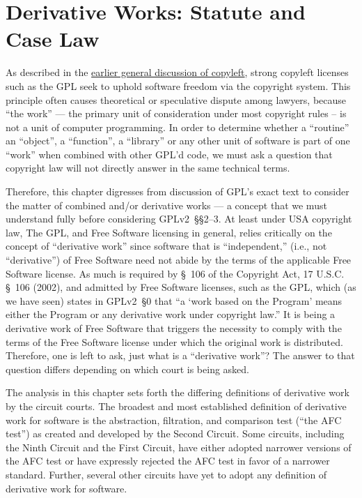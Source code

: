 
\chapter{Derivative Works: Statute and Case Law}
\label{derivative-works}

As described in the \hyperref[copyleft-definition]{earlier general discussion
  of copyleft}, strong copyleft licenses such as the GPL seek to uphold
software freedom via the copyright system.  This principle often causes
theoretical or speculative dispute among lawyers, because ``the work'' ---
the primary unit of consideration under most copyright rules -- is not a unit
of computer programming. In order to determine whether a ``routine'' an
``object'', a ``function'', a ``library'' or any other unit of software is
part of one ``work'' when combined with other GPL'd code, we must ask a
question that copyright law will not directly answer in the same technical
terms.

Therefore, this chapter digresses from  discussion of GPL's exact text to
consider the matter of combined and/or derivative works --- a concept that we must
understand fully before considering GPLv2~\S\S2--3\@.  At least under USA
copyright law, The GPL, and Free
Software licensing in general, relies critically on the concept of
``derivative work'' since software that is ``independent,'' (i.e., not
``derivative'') of Free Software need not abide by the terms of the
applicable Free Software license. As much is required by \S~106 of the
Copyright Act, 17 U.S.C. \S~106 (2002), and admitted by Free Software
licenses, such as the GPL, which (as we have seen) states in GPLv2~\S0 that ``a
`work based on the Program' means either the Program or any derivative
work under copyright law.'' It is being a derivative work of Free Software
that triggers the necessity to comply with the terms of the Free Software
license under which the original work is distributed. Therefore, one is
left to ask, just what is a ``derivative work''? The answer to that
question differs depending on which court is being asked.

The analysis in this chapter sets forth the differing definitions of
derivative work by the circuit courts. The broadest and most
established definition of derivative work for software is the
abstraction, filtration, and comparison test (``the AFC test'') as
created and developed by the Second Circuit. Some circuits, including
the Ninth Circuit and the First Circuit, have either adopted narrower
versions of the AFC test or have expressly rejected the AFC test in
favor of a narrower standard. Further, several other circuits have yet
to adopt any definition of derivative work for software.

